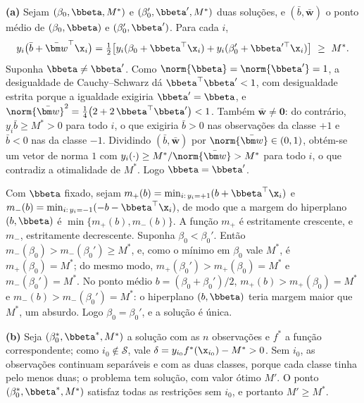 \begin{solucao}
\textbf{(a)} Sejam $(\beta_0,\bbeta,M^*)$ e $(\beta_0',\bbeta',M^*)$ duas soluções, e
$(\bar b,\bar{\bm w})$ o ponto médio de $(\beta_0,\bbeta)$ e $(\beta_0',\bbeta')$. Para cada
$i$,
\[
  y_i\big(\bar b+\bar{\bm w}^\top\x_i\big)
  =\tfrac12\big[y_i(\beta_0+\bbeta^\top\x_i)+y_i(\beta_0'+\bbeta'^\top\x_i)\big]\ \ge\ M^* .
\]
Suponha $\bbeta\ne\bbeta'$. Como $\norm{\bbeta}=\norm{\bbeta'}=1$, a desigualdade de
Cauchy--Schwarz dá $\bbeta^\top\bbeta'<1$, com desigualdade estrita porque a igualdade
exigiria $\bbeta'=\bbeta$, e
$\norm{\bar{\bm w}}^2=\tfrac14\big(2+2\,\bbeta^\top\bbeta'\big)<1$. Também
$\bar{\bm w}\ne\bm0$: do contrário, $y_i\bar b\ge M^*>0$ para todo $i$, o que exigiria
$\bar b>0$ nas observações da classe $+1$ e $\bar b<0$ nas da classe $-1$. Dividindo
$(\bar b,\bar{\bm w})$ por $\norm{\bar{\bm w}}\in(0,1)$, obtém-se um vetor de norma $1$ com
$y_i(\cdot)\ge M^*/\norm{\bar{\bm w}}>M^*$ para todo $i$, o que contradiz a otimalidade de
$M^*$. Logo $\bbeta=\bbeta'$.

Com $\bbeta$ fixado, sejam
$m_+(b)=\min_{i:\,y_i=+1}(b+\bbeta^\top\x_i)$ e $m_-(b)=\min_{i:\,y_i=-1}(-b-\bbeta^\top\x_i)$,
de modo que a margem do hiperplano $(b,\bbeta)$ é $\min\{m_+(b),m_-(b)\}$. A função $m_+$ é
estritamente crescente, e $m_-$, estritamente decrescente. Suponha $\beta_0<\beta_0'$. Então
$m_-(\beta_0)>m_-(\beta_0')\ge M^*$, e, como o mínimo em $\beta_0$ vale $M^*$, é
$m_+(\beta_0)=M^*$; do mesmo modo, $m_+(\beta_0')>m_+(\beta_0)=M^*$ e $m_-(\beta_0')=M^*$. No
ponto médio $b=(\beta_0+\beta_0')/2$, $m_+(b)>m_+(\beta_0)=M^*$ e $m_-(b)>m_-(\beta_0')=M^*$:
o hiperplano $(b,\bbeta)$ teria margem maior que $M^*$, um absurdo. Logo $\beta_0=\beta_0'$, e
a solução é única.

\smallskip
\textbf{(b)} Seja $(\beta_0^*,\bbeta^*,M^*)$ a solução com as $n$ observações e $f^*$ a função
correspondente; como $i_0\notin\mathcal S$, vale $\delta=y_{i_0}f^*(\x_{i_0})-M^*>0$. Sem
$i_0$, as observações continuam separáveis e com as duas classes, porque cada classe tinha
pelo menos duas; o problema tem solução, com valor ótimo $M'$. O ponto
$(\beta_0^*,\bbeta^*,M^*)$ satisfaz todas as restrições sem $i_0$, e portanto $M'\ge M^*$.


\end{solucao}
